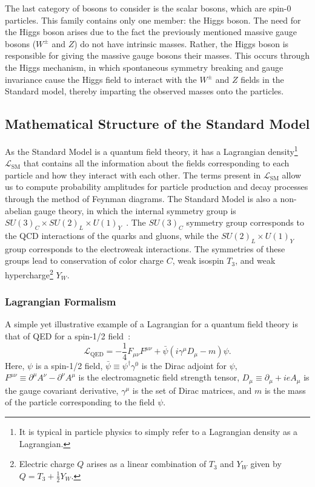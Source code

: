 The last category of bosons to consider is the scalar bosons, which are spin-0 particles.
This family contains only one member: the Higgs boson.
The need for the Higgs boson arises due to the fact the previously mentioned massive gauge bosons ($W^\pm$ and $Z$) do not have intrinsic masses.
Rather, the Higgs boson is responsible for giving the massive gauge bosons their masses.
This occurs through the Higgs mechanism, in which spontaneous symmetry breaking and gauge invariance cause the Higgs field to interact with the $W^\pm$ and $Z$ fields in the Standard model, thereby imparting the observed masses onto the particles.

\subsection{Mathematical Structure of the Standard Model}

As the Standard Model is a quantum field theory, it has a Lagrangian density\footnote{It is typical in particle physics to simply refer to a Lagrangian density as a Lagrangian.} $\mathcal{L}_\mathrm{SM}$ that contains all the information about the fields corresponding to each particle and how they interact with each other.
The terms present in $\mathcal{L}_\mathrm{SM}$ allow us to compute probability amplitudes for particle production and decay processes through the method of Feynman diagrams.
The Standard Model is also a non-abelian gauge theory, in which the internal symmetry group is $SU(3)_C\times SU(2)_L\times U(1)_Y$~\cite{Srednicki:1019751}.
The $SU(3)_C$ symmetry group corresponds to the QCD interactions of the quarks and gluons, while the $SU(2)_L\times U(1)_Y$ group corresponds to the electroweak interactions.
The symmetries of these groups lead to conservation of color charge $C$, weak isospin $T_3$, and weak hypercharge\footnote{Electric charge $Q$ arises as a linear combination of $T_3$ and $Y_W$ given by $Q=T_3+\frac{1}{2}Y_W$.} $Y_W$.

\subsubsection{Lagrangian Formalism}

A simple yet illustrative example of a Lagrangian for a quantum field theory is that of QED for a spin-1/2 field~\cite{Klauber:2013ipa}:
\begin{equation}\label{eq:QED}
  \mathcal{L}_\mathrm{QED}=-\frac{1}{4}F_{\mu\nu}F^{\mu\nu}+\bar{\psi}(i\gamma^\mu D_\mu-m)\psi.
\end{equation}
Here, $\psi$ is a spin-1/2 field, $\bar{\psi}\equiv\psi^\dagger\gamma^0$ is the Dirac adjoint for $\psi$, $F^{\mu\nu}\equiv\partial^\mu A^\nu-\partial^\nu A^\mu$ is the electromagnetic field strength tensor, $D_\mu\equiv\partial_\mu+ieA_\mu$ is the gauge covariant derivative, $\gamma^\mu$ is the set of Dirac matrices, and $m$ is the mass of the particle corresponding to the field $\psi$.

